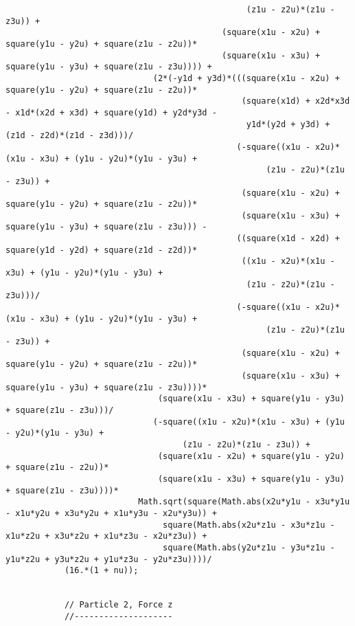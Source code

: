 \begin{lstlisting}
												 (z1u - z2u)*(z1u - z3u)) + 
											(square(x1u - x2u) + square(y1u - y2u) + square(z1u - z2u))*
											(square(x1u - x3u) + square(y1u - y3u) + square(z1u - z3u)))) + 
							  (2*(-y1d + y3d)*(((square(x1u - x2u) + square(y1u - y2u) + square(z1u - z2u))*
												(square(x1d) + x2d*x3d - x1d*(x2d + x3d) + square(y1d) + y2d*y3d - 
												 y1d*(y2d + y3d) + (z1d - z2d)*(z1d - z3d)))/
											   (-square((x1u - x2u)*(x1u - x3u) + (y1u - y2u)*(y1u - y3u) + 
													 (z1u - z2u)*(z1u - z3u)) + 
												(square(x1u - x2u) + square(y1u - y2u) + square(z1u - z2u))*
												(square(x1u - x3u) + square(y1u - y3u) + square(z1u - z3u))) - 
											   ((square(x1d - x2d) + square(y1d - y2d) + square(z1d - z2d))*
												((x1u - x2u)*(x1u - x3u) + (y1u - y2u)*(y1u - y3u) + 
												 (z1u - z2u)*(z1u - z3u)))/
											   (-square((x1u - x2u)*(x1u - x3u) + (y1u - y2u)*(y1u - y3u) + 
													 (z1u - z2u)*(z1u - z3u)) + 
												(square(x1u - x2u) + square(y1u - y2u) + square(z1u - z2u))*
												(square(x1u - x3u) + square(y1u - y3u) + square(z1u - z3u))))*
							   (square(x1u - x3u) + square(y1u - y3u) + square(z1u - z3u)))/
							  (-square((x1u - x2u)*(x1u - x3u) + (y1u - y2u)*(y1u - y3u) + 
									(z1u - z2u)*(z1u - z3u)) + 
							   (square(x1u - x2u) + square(y1u - y2u) + square(z1u - z2u))*
							   (square(x1u - x3u) + square(y1u - y3u) + square(z1u - z3u))))*
						   Math.sqrt(square(Math.abs(x2u*y1u - x3u*y1u - x1u*y2u + x3u*y2u + x1u*y3u - x2u*y3u)) + 
								square(Math.abs(x2u*z1u - x3u*z1u - x1u*z2u + x3u*z2u + x1u*z3u - x2u*z3u)) + 
								square(Math.abs(y2u*z1u - y3u*z1u - y1u*z2u + y3u*z2u + y1u*z3u - y2u*z3u))))/
			(16.*(1 + nu));
			
			
			// Particle 2, Force z
			//--------------------
			

\end{lstlisting}
